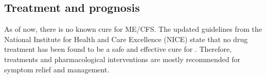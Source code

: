 

\subsection{Treatment and prognosis}
\label{subsec:treatment-prognosis}

As of now, there is no known cure for ME/CFS.
The updated guidelines from the National Institute for Health and Care Excellence (NICE) state that no drug treatment has been found to be a safe and effective cure for \cfs \citep{niceguideline2021OverviewMyalgic}.
Therefore, treatments and pharmacological interventions are mostly recommended for symptom relief and management.

